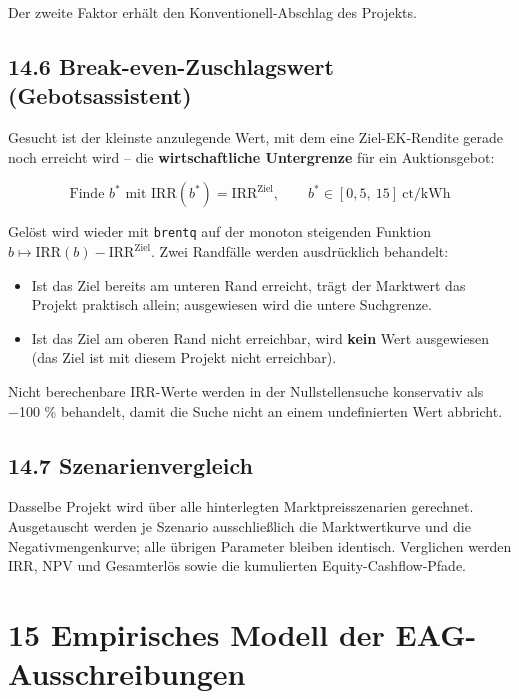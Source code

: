 \documentclass[
  a4paper,
  10pt]{article}
\providecommand{\tightlist}{%
  \setlength{\itemsep}{0pt}\setlength{\parskip}{0pt}}
\begin{document}
Der zweite Faktor erhält den Konventionell-Abschlag des Projekts.

\hypertarget{break-even-zuschlagswert-gebotsassistent}{%
\subsection{14.6 Break-even-Zuschlagswert
(Gebotsassistent)}\label{break-even-zuschlagswert-gebotsassistent}}

Gesucht ist der kleinste anzulegende Wert, mit dem eine Ziel-EK-Rendite
gerade noch erreicht wird -- die \textbf{wirtschaftliche Untergrenze}
für ein Auktionsgebot:

\[ \text{Finde } b^{*} \text{ mit } \mathrm{IRR}\left(b^{*}\right) = \mathrm{IRR}^{\mathrm{Ziel}}, \qquad b^{*} \in [0{,}5,\ 15]\ \text{ct/kWh} \]

Gelöst wird wieder mit \texttt{brentq} auf der monoton steigenden
Funktion \(b \mapsto \mathrm{IRR}(b) - \mathrm{IRR}^{\mathrm{Ziel}}\).
Zwei Randfälle werden ausdrücklich behandelt:

\begin{itemize}
\tightlist
\item
  Ist das Ziel bereits am unteren Rand erreicht, trägt der Marktwert das
  Projekt praktisch allein; ausgewiesen wird die untere Suchgrenze.
\item
  Ist das Ziel am oberen Rand nicht erreichbar, wird \textbf{kein} Wert
  ausgewiesen (das Ziel ist mit diesem Projekt nicht erreichbar).
\end{itemize}

Nicht berechenbare IRR-Werte werden in der Nullstellensuche konservativ
als −100 \% behandelt, damit die Suche nicht an einem undefinierten Wert
abbricht.

\hypertarget{szenarienvergleich}{%
\subsection{14.7 Szenarienvergleich}\label{szenarienvergleich}}

Dasselbe Projekt wird über alle hinterlegten Marktpreisszenarien
gerechnet. Ausgetauscht werden je Szenario ausschließlich die
Marktwertkurve und die Negativmengenkurve; alle übrigen Parameter
bleiben identisch. Verglichen werden IRR, NPV und Gesamterlös sowie die
kumulierten Equity-Cashflow-Pfade.

\hypertarget{empirisches-modell-der-eag-ausschreibungen}{%
\section{15 Empirisches Modell der
EAG-Ausschreibungen}\label{empirisches-modell-der-eag-ausschreibungen}}
\end{document}
